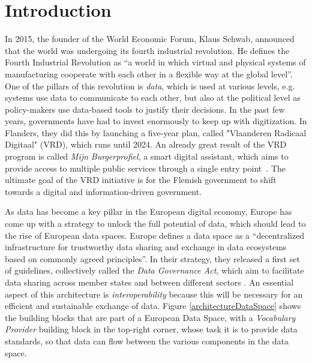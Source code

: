 \documentclass[manuscript]{acmart}
\begin{document}
\section{Introduction}
In 2015, the founder of the World Economic Forum, Klaus Schwab, announced that the world was undergoing its fourth industrial revolution. 
He defines the Fourth Industrial Revolution as ``a world in which virtual and physical systems of manufacturing cooperate with each other in a flexible way at the global level''\cite{schwab2017fourth}. 
One of the pillars of this revolution is \emph{data}, which is used at various levels, e.g. systems use data to communicate to each other, but also at the political level as policy-makers use data-based tools to justify their decisions.
In the past few years, governments have had to invest enormously to keep up with digitization.
In Flanders, they did this by launching a five-year plan, called "Vlaanderen Radicaal Digitaal" (VRD), which runs until 2024.
An already great result of the VRD program is called \textit{Mijn Burgerprofiel}, a smart digital assistant, which aims to provide access to multiple public services through a single entry point~\cite{buyle2018semantics}.
The ultimate goal of the VRD initiative is for the Flemish government to shift towards a digital and information-driven government.


As data has become a key pillar in the European digital economy, Europe has come up with a strategy to unlock the full potential of data, which should lead to the rise of European data spaces.
Europe defines a data space as a ``decentralized infrastructure for trustworthy data sharing and exchange in data ecosystems based on commonly agreed principles''.
In their strategy, they released a first set of guidelines, collectively called the \emph{Data Governance Act}, which aim to facilitate data sharing across member states and between different sectors \cite{designDataSpaces, dataGovernanceAct}.
An essential aspect of this architecture is \emph{interoperability} because this will be necessary for an efficient and sustainable exchange of data.
Figure \ref{architectureDataSpace} shows the building blocks that are part of a European Data Space, with a \emph{Vocabulary Provider} building block in the top-right corner, whose task it is to provide data standards, so that data can flow between the various components in the data space.
\end{document}
